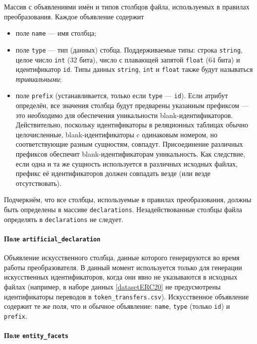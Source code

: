 Массив с объявлениями имён и типов столбцов файла, используемых в правилах преобразования. Каждое объявление содержит
\begin{itemize}
  \item поле \texttt{name} --- имя столбца;
  \item поле \texttt{type} --- тип (данных) стобца. Поддерживаемые типы: строка \texttt{string}, целое число
    \texttt{int} (32 бита), число с плавающей запятой \texttt{float} (64 бита) и идентификатор \texttt{id}. Типы данных
    \texttt{string}, \texttt{int} и \texttt{float} также будут называться \textit{тривиальными};
  \item поле \texttt{prefix} (устанавливается, только если \texttt{type} --- \texttt{id}). Если атрибут определён, все
    значения столбца будут предварены указанным префиксом --- это необходимо для обеспечения уникальности
    blank-идентификаторов. Действительно, поскольку идентификаторы в реляционных таблицах обычно целочисленные,
    blank-идентификаторы c одинаковым номером, но соответствующие разным сущностям, совпадут. Присоединение различных
    префиксов обеспечит blank-идентификаторам уникальность. Как следствие, если одна и та же сущность используется в
    различных исходных файлах, префикс её идентификаторов должен совпадать везде (или везде отсутствовать).
\end{itemize}

Подчеркнём, что все столбцы, используемые в правилах преобразования, должны быть определены в массиве
\texttt{declarations}. Незадействованные столбцы файла определять в \texttt{declarations} не следует.

\paragraph{Поле \texttt{artificial\_declaration}}

Объявление искусственного столбца, данные которого генерируются во время работы преобразователя. В данный момент
используется только для генерации искусственных идентификаторов, когда они явно не указываются в исходных файлах
(например, в наборе данных \ref{datasetERC20} не предусмотрены идентификаторы переводов в
\texttt{token\_transfers.csv}). Искусственное объявление содержит те же поля, что и обычное объявление: \texttt{name},
\texttt{type} (только \texttt{id}) и \texttt{prefix}.

\paragraph{Поле \texttt{entity\_facets}}

